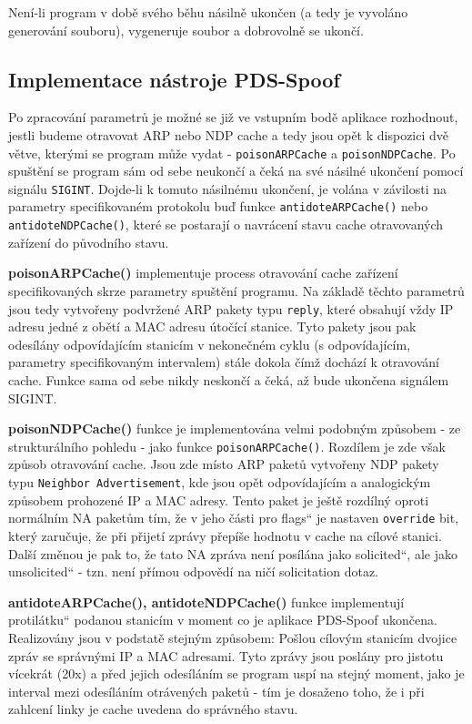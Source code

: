 \documentclass[a4paper, 11pt]{article}
\providecommand{\uv}[1]{\quotedblbase #1\textquotedblleft}
\begin{document}
	\par{Není-li program v době svého běhu násilně ukončen (a tedy je vyvoláno generování souboru), vygeneruje soubor a dobrovolně se ukončí.}

\subsection{Implementace nástroje PDS-Spoof}
	\par{Po zpracování parametrů je možné se již ve vstupním bodě aplikace rozhodnout, jestli budeme otravovat ARP nebo NDP cache  a tedy jsou opět k dispozici dvě větve, kterými se program může vydat - \texttt{poisonARPCache} a \texttt{poisonNDPCache}. Po spuštění se program sám od sebe neukončí a čeká na své násilné ukončení pomocí signálu \texttt{SIGINT}. Dojde-li k tomuto násilnému ukončení, je volána v závilosti na parametry specifikovaném protokolu buď funkce \texttt{antidoteARPCache()} nebo \texttt{antidoteNDPCache()}, které se postarají o navrácení stavu cache otravovaných zařízení do původního stavu.}

	\par{\textbf{poisonARPCache()} implementuje process otravování cache zařízení specifikovaných skrze parametry spuštění programu. Na základě těchto parametrů jsou tedy vytvořeny podvržené ARP pakety typu \texttt{reply}, které obsahují vždy IP adresu jedné z obětí a MAC adresu útočící stanice. Tyto pakety jsou pak odesílány odpovídajícím stanicím v nekonečném cyklu (s odpovídajícím, parametry specifikovaným intervalem) stále dokola čímž dochází k otravování cache. Funkce sama od sebe nikdy neskončí a čeká, až bude ukončena signálem SIGINT.}

	\par{\textbf{poisonNDPCache()} funkce je implementována velmi podobným způsobem \-- ze strukturálního pohledu \-- jako funkce \texttt{poisonARPCache()}. Rozdílem je zde však způsob otravování cache. Jsou zde místo ARP paketů vytvořeny NDP pakety typu \texttt{Neighbor Advertisement}, kde jsou opět odpovídajícím a analogickým způsobem prohozené IP a MAC adresy. Tento paket je ještě rozdílný oproti normálním NA paketům tím, že v jeho části pro \uv{flags} je nastaven \texttt{override} bit, který zaručuje, že při přijetí zprávy přepíše hodnotu v cache na cílové stanici. Další změnou je pak to, že tato NA zpráva není posílána jako \uv{solicited}, ale jako \uv{unsolicited} \-- tzn. není přímou odpovědí na ničí solicitation dotaz.}

	\par{\textbf{antidoteARPCache(), antidoteNDPCache()} funkce implementují \uv{protilátku} podanou stanicím v moment co je aplikace PDS-Spoof ukončena. Realizovány jsou v podstatě stejným způsobem: Pošlou cílovým stanicím dvojice zpráv se správnými IP a MAC adresami. Tyto zprávy jsou poslány pro jistotu vícekrát (20x) a před jejich odesíláním se program uspí na stejný moment, jako je interval mezi odesíláním otrávených paketů \-- tím je dosaženo toho, že i při zahlcení linky je cache uvedena do správného stavu.}
\end{document}
